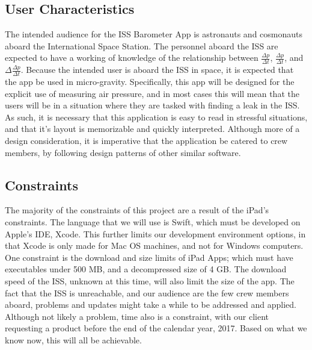\documentclass[onecolumn, draftclsnofoot,10pt, compsoc]{IEEEtran}
\def \CapstoneProjectName{ISS Barometer App }
\begin{document}
\subsection{User Characteristics}
The intended audience for the \CapstoneProjectName is astronauts and cosmonauts aboard the International Space Station.
The personnel aboard the ISS are expected to have a working of knowledge of the relationship between $\frac{\Delta p}{\Delta t}$, $\frac{\Delta p}{\Delta t}$, and $\Delta \frac{\Delta p}{\Delta t}$.
Because the intended user is aboard the ISS in space, it is expected that the app be used in micro-gravity.
Specifically, this app will be designed for the explicit use of measuring air pressure, and in most cases this will mean that the users will be in a situation where they are tasked with finding a leak in the ISS.
As such, it is necessary that this application is easy to read in stressful situations, and that it's layout is memorizable and quickly interpreted.
Although more of a design consideration, it is imperative that the application be catered to crew members, by following design patterns of other similar software.

\subsection{Constraints}
The majority of the constraints of this project are a result of the iPad's constraints.
The language that we will use is Swift, which must be developed on Apple's IDE, Xcode.
This further limits our development environment options, in that Xcode is only made for Mac OS machines, and not for Windows computers.
One constraint is the download and size limits of iPad Apps; which must have executables under 500 MB, and a decompressed size of 4 GB.
The download speed of the ISS, unknown at this time, will also limit the size of the app.
The fact that the ISS is unreachable, and our audience are the few crew members aboard, problems and updates might take a while to be addressed and applied.
Although not likely a problem, time also is a constraint, with our client requesting a product before the end of the calendar year, 2017.
Based on what we know now, this will all be achievable.
\end{document}
